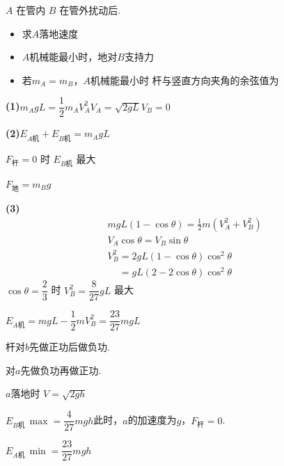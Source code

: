 \begin{problem}[3、]
$A$ 在管内 $B$ 在管外\quad 扰动后.
\begin{itemize}
\item[(1)] 求$A$落地速度
\item[(2)] $A$机械能最小时，地对$B$支持力
\item[(3)] 若$m_A=m_B$，$A$机械能最小时 杆与竖直方向夹角的余弦值为
\end{itemize}
\begin{solution}
\textbf{(1)}\quad $m_AgL=\dfrac{1}{2}m_AV_A^{2}$\quad $V_A=\sqrt{2gL}$\quad $V_B=0$

\textbf{(2)}\quad $E_{A\text{机}}+E_{B\text{机}}=m_AgL$

$F_{\text{杆}}=0$ 时 $E_{B\text{机}}$ 最大

$F_{\text{地}}=m_Bg$


\textbf{(3)}
\begin{align*}
&mgL(1-\cos\theta)=\frac{1}{2}m(V_A^{2}+V_B^{2})\\
&V_A\cos\theta=V_B\sin\theta\\
&V_B^{2}=2gL(1-\cos\theta)\cos^{2}\theta\\
&\phantom{V_B^{2}}=gL(2-2\cos\theta)\cos^{2}\theta
\end{align*}
$\cos\theta=\dfrac{2}{3}$ 时 $V_B^{2}=\dfrac{8}{27}gL$ 最大

$E_{A\text{机}}=mgL-\dfrac{1}{2}mV_B^{2}=\dfrac{23}{27}mgL$
\end{solution}
\end{problem}
\begin{problem}[4、]
\begin{solution}
杆对$b$先做正功后做负功.

对$a$先做负功再做正功.

$a$落地时 $V=\sqrt{2gh}$

$E_{B\text{机}}\,\max=\dfrac{4}{27}mgh$\quad 此时，$a$的加速度为$g$，$F_{\text{杆}}=0$.

$E_{A\text{机}}\,\min=\dfrac{23}{27}mgh$
\end{solution}
\end{problem}
